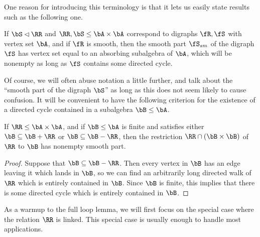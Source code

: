 One reason for introducing this terminology is that it lets us easily state results such as the following one.

\begin{prop} If $\bS \lhd \RR$ and $\RR,\bS \le \bA\times \bA$ correspond to digraphs $\fR, \fS$ with vertex set $\bA$, and if $\fR$ is smooth, then the smooth part $\fS_{sm}$ of the digraph $\fS$ has vertex set equal to an absorbing subalgebra of $\bA$, which will be nonempty as long as $\fS$ contains some directed cycle.
\end{prop}

Of course, we will often abuse notation a little further, and talk about the ``smooth part of the digraph $\bS$'' as long as this does not seem likely to cause confusion. It will be convenient to have the following criterion for the existence of a directed cycle contained in a subalgebra $\bB \le \bA$.

\begin{prop} If $\RR \le \bA \times \bA$, and if $\bB \le \bA$ is finite and satisfies either $\bB \subseteq \bB + \RR$ or $\bB \subseteq \bB-\RR$, then the restriction $\RR \cap (\bB \times \bB)$ of $\RR$ to $\bB$ has nonempty smooth part.
\end{prop}
\begin{proof} Suppose that $\bB \subseteq \bB - \RR$. Then every vertex in $\bB$ has an edge leaving it which lands in $\bB$, so we can find an arbitrarily long directed walk of $\RR$ which is entirely contained in $\bB$. Since $\bB$ is finite, this implies that there is some directed cycle which is entirely contained in $\bB$.
\end{proof}

As a warmup to the full loop lemma, we will first focus on the special case where the relation $\RR$ is linked. This special case is usually enough to handle most applications.

